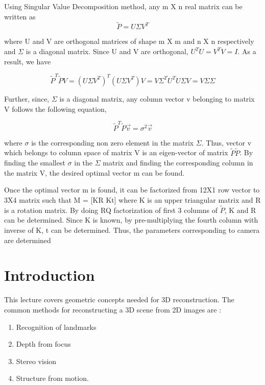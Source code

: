 \documentclass[twoside]{article}
\begin{document}
Using Singular Value Decomposition method, any m X n real matrix can be written as 
\begin{equation} \label{eqno:9}
\tilde{P} = U \Sigma V^T \end{equation}

where U and V are orthogonal matrices of shape m X m and n X n respectively and $\Sigma $ is a diagonal matrix. Since U and V are orthogonal, $U^TU = V^TV = I$.  As a result, we have

\begin{equation} \label{eqno:10}
\tilde{P}^T \tilde{P} V = (U \Sigma V^T)^T (U \Sigma V^T) V = V \Sigma^T U^T U \Sigma V = V \Sigma \Sigma  \end{equation}

Further, since,  $\Sigma$ is a diagonal matrix, any column vector v belonging to matrix V follows the following equation,

\begin{equation} \label{eqno:10}
\tilde{P}^T \tilde{P} \vec{v} = \sigma^2 \vec{v}  \end{equation}

where $\sigma$ is the corresponding non zero element in the matrix $\Sigma$. Thus, vector v which belongs to column space of matrix V is an eigen-vector of matrix $\tilde{P}\tilde{P}$. By finding the smallest $\sigma$ in the $\Sigma$ matrix and finding the corresponding column in the matrix V, the desired optimal vector m can be found.

Once the optimal vector m is found, it can be factorized from 12X1 row vector to 3X4 matrix such that M = [KR Kt] where K is an upper triangular matrix and R is a rotation matrix. By doing RQ factorization of first 3 columns of $\tilde{P}$, K and R can be determined. Since K is known, by pre-multiplying the fourth column with inverse of K, t can be determined. Thus, the parameters corresponding to camera are determined

\section{Introduction}

	This lecture \cite{slides} covers geometric concepts needed for 3D reconstruction.  The common methods for reconstructing a 3D scene from 2D images are :
\begin{enumerate}
\item Recognition of landmarks
\item Depth from focus
\item Stereo vision
\item Structure from motion.
\end{enumerate}
\end{document}
